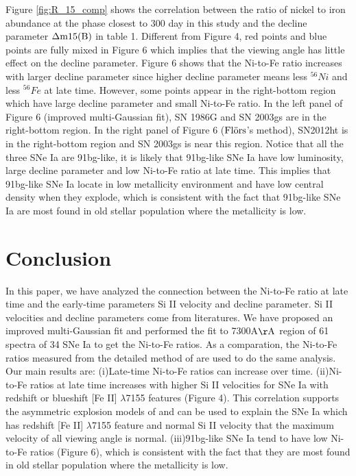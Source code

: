 \documentclass[twocolumn]{aastex631}
\begin{document}
Figure \ref{fig:R_15_comp} shows the correlation between the ratio of nickel to iron abundance at the phase closest to 300 day in this study and the decline parameter $\rm {\Delta}m15(B)$ in table 1. Different from Figure 4, red points and blue points are fully mixed in Figure 6 which implies that the viewing angle has little effect on the decline parameter. Figure 6 shows that the Ni-to-Fe ratio increases with larger decline parameter since higher decline parameter means less $^{56}Ni$ and less $^{56}Fe$ at late time. However, some points appear in the right-bottom region which have large decline parameter and small Ni-to-Fe ratio. In the left panel of Figure 6 (improved multi-Gaussian fit), SN 1986G and SN 2003gs are in the right-bottom region. In the right panel of Figure 6 ($\rm Fl\ddot{o}rs$’s method), SN2012ht is in the right-bottom region and SN 2003gs is near this region. Notice that all the three SNe Ia are 91bg-like, it is likely that 91bg-like SNe Ia have low luminosity, large decline parameter and low Ni-to-Fe ratio at late time. This implies that 91bg-like SNe Ia locate in low metallicity environment and have low central density when they explode, which is consistent with the fact that 91bg-like SNe Ia are most found in old stellar population \citep{2019PASA...36...31P} where the metallicity is low.

\section{Conclusion} \label{sec:conclusion}

In this paper, we have analyzed the connection between the Ni-to-Fe ratio at late time and the early-time parameters Si II velocity and decline parameter. Si II velocities and decline parameters come from literatures. We have proposed an improved multi-Gaussian fit and performed the fit to 7300A$\rm \AA$ region of 61 spectra of 34 SNe Ia to get the Ni-to-Fe ratios. As a comparation, the Ni-to-Fe ratios measured from the detailed method of \citet{2020MNRAS.491.2902F} are used to do the same analysis. 
	Our main results are:
  (i)Late-time Ni-to-Fe ratios can increase over time. 
  (ii)Ni-to-Fe ratios at late time increases with higher Si II velocities for SNe Ia with redshift or blueshift [Fe II] $\lambda$7155 features (Figure 4). This correlation supports the asymmetric explosion models of \citet{2010Natur.466...82M} and can be used to explain the SNe Ia which has redshift [Fe II] $\lambda$7155 feature and normal Si II velocity that the maximum velocity of all viewing angle is normal. 
  (iii)91bg-like SNe Ia tend to have low Ni-to-Fe ratios (Figure 6), which is consistent with the fact that they are most found in old stellar population \citep{2019PASA...36...31P} where the metallicity is low.
\end{document}
